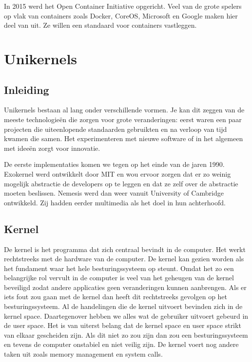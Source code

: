 \documentclass[pdftex,a4paper,12pt,twoside]{report}
\begin{document}
In 2015 werd het Open Container Initiative opgericht. Veel van de grote spelers op vlak van containers zoals Docker, CoreOS, Microsoft en Google maken hier deel van uit. Ze willen een standaard voor containers vastleggen.

\chapter{Unikernels}
\label{ch:unikernels}

\section{Inleiding}

Unikernels bestaan al lang onder verschillende vormen. Je kan dit zeggen van de meeste technologieën die zorgen voor grote veranderingen: eerst waren een paar projecten die uiteenlopende standaarden gebruikten en na verloop van tijd kwamen die samen. Het experimenteren met nieuwe software of in het algemeen met ideeën zorgt voor innovatie. 

De eerste implementaties komen we tegen op het einde van de jaren 1990. Exokernel werd ontwikkelt door MIT en wou ervoor zorgen dat er zo weinig mogelijk abstractie de developers op te leggen en dat ze zelf over de abstractie moeten beslissen. Nemesis werd dan weer vanuit University of Cambridge ontwikkeld. Zij hadden eerder multimedia als het doel in hun achterhoofd. 

\section{Kernel}

De kernel is het programma dat zich centraal bevindt in de computer. Het werkt rechtstreeks met de hardware van de computer.  De kernel kan gezien worden als het fundament waar het hele besturingssysteem op steunt. Omdat het zo een belangrijke rol vervult in de computer is veel van het geheugen van de kernel beveiligd zodat andere applicaties geen veranderingen kunnen aanbrengen. Als er iets fout zou gaan met de kernel dan heeft dit rechtstreeks gevolgen op het besturingssysteem. Al de handelingen die de kernel uitvoert bevinden zich in de kernel space. Daartegenover hebben we alles wat de gebruiker uitvoert gebeurd in de user space. Het is van uiterst belang dat de kernel space en user space strikt van elkaar gescheiden zijn. Als dit niet zo zou zijn dan zou een besturingssysteem en tevens de computer onstabiel en niet veilig zijn. De kernel voert nog andere taken uit zoals memory management en system calls.
\end{document}
